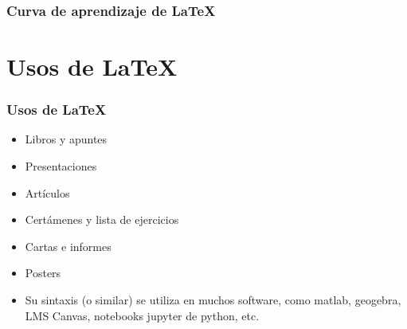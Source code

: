 \documentclass{beamer}
\begin{document}
\begin{frame}
  \frametitle{Curva de aprendizaje de \LaTeX}

  
\end{frame}

\section{Usos de \LaTeX}
\begin{frame}
  \frametitle{}
  \begin{center}
    \Large{}
  \end{center}
\end{frame}


\begin{frame}
  \frametitle{Usos de \LaTeX}


  \begin{itemize}
  \item Libros y apuntes
    \pause
  \item Presentaciones
    \pause
  \item Art\'iculos
    \pause
  \item Cert\'amenes y lista de ejercicios
    \pause
  \item Cartas e informes
    \pause
  \item Posters
    \pause
  \item Su sintaxis (o similar) se utiliza en muchos software, como
    matlab, geogebra, LMS Canvas, notebooks jupyter de python, etc.
  \end{itemize}
\end{frame}
\end{document}
